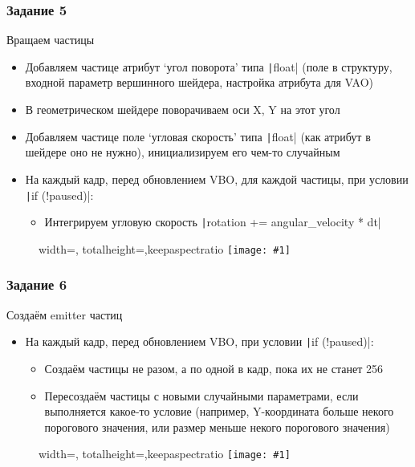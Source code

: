 \documentclass[10pt]{beamer}
\newcommand{\slideimage}[1]{
  \begin{figure}
    \begin{adjustbox}{width=\textwidth, totalheight=\textheight-2\baselineskip-2\baselineskip,keepaspectratio}
      \texttt{[image: \#1]}
    \end{adjustbox}
  \end{figure}
}
\begin{document}
\begin{frame}[fragile]
\frametitle{Задание 5}
Вращаем частицы
\begin{itemize}
\item Добавляем частице атрибут `угол поворота' типа \texttt|float| (поле в структуру, входной параметр вершинного шейдера, настройка атрибута для VAO)
\item В геометрическом шейдере поворачиваем оси X, Y на этот угол
\item Добавляем частице поле `угловая скорость' типа \texttt|float| (как атрибут в шейдере оно не нужно), инициализируем его чем-то случайным
\item На каждый кадр, перед обновлением VBO, для каждой частицы, при условии \texttt|if (!paused)|:
\begin{itemize}
\item Интегрируем угловую скорость \texttt|rotation += angular_velocity * dt|
\end{itemize}
\end{itemize}
\end{frame}

\begin{frame}[fragile]
\slideimage{5.png}
\end{frame}

\begin{frame}[fragile]
\frametitle{Задание 6}
Создаём emitter частиц
\begin{itemize}
\item На каждый кадр, перед обновлением VBO, при условии \texttt|if (!paused)|:
\begin{itemize}
\item Создаём частицы не разом, а по одной в кадр, пока их не станет 256
\item Пересоздаём частицы с новыми случайными параметрами, если выполняется какое-то условие (например, Y-координата больше некого порогового значения, или размер меньше некого порогового значения)
\end{itemize}
\end{itemize}
\end{frame}

\begin{frame}[fragile]
\slideimage{6.png}
\end{frame}
\end{document}

